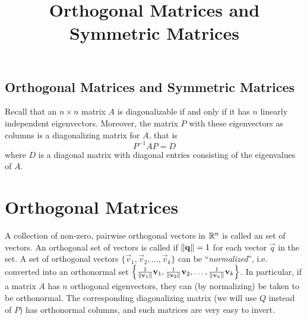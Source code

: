 \documentclass{ximera}
\title{Orthogonal Matrices and Symmetric Matrices} \license{CC BY-NC-SA 4.0}
\begin{document}
\begin{abstract}

\end{abstract}
\maketitle

\begin{onlineOnly}
\section*{Orthogonal Matrices and Symmetric Matrices}
\end{onlineOnly}

Recall that an $n \times n$ matrix $A$ is diagonalizable if and only if it has $n$ linearly independent eigenvectors.  Moreover, the matrix $P$ with these eigenvectors as columns is a diagonalizing matrix for $A$, that is
\begin{equation*}
P^{-1}AP =D
\end{equation*}
where $D$ is a diagonal matrix with diagonal entries consisting of the eigenvalues of $A$.

\section*{Orthogonal Matrices}
A collection of non-zero, pairwise orthogonal vectors in $\mathbb{R}^n$ is called an  set of vectors. An orthogonal set of vectors is called  if $\left\lVert\mathbf{q}\right\rVert = 1$ for each vector $\vec{q}$ in the set. A set of orthogonal vectors $\{\vec{v}_{1}, \vec{v}_{2}, \dots, \vec{v}_{k}\}$ can be ``\textit{normalized}'', i.e. converted into an orthonormal set $\left\{ \frac{1}{\left\lVert\mathbf{v}_{1}\right\rVert}\mathbf{v}_{1}, \frac{1}{\left\lVert\mathbf{v}_{2}\right\rVert}\mathbf{v}_{2}, \dots, \frac{1}{\left\lVert\mathbf{v}_{k}\right\rVert}\mathbf{v}_{k} \right\}$. In particular, if a matrix $A$ has $n$ orthogonal eigenvectors, they can (by normalizing) be taken to be orthonormal. The corresponding diagonalizing matrix (we will use $Q$ instead of $P$) has orthonormal columns, and such matrices are very easy to invert.
\end{document}
